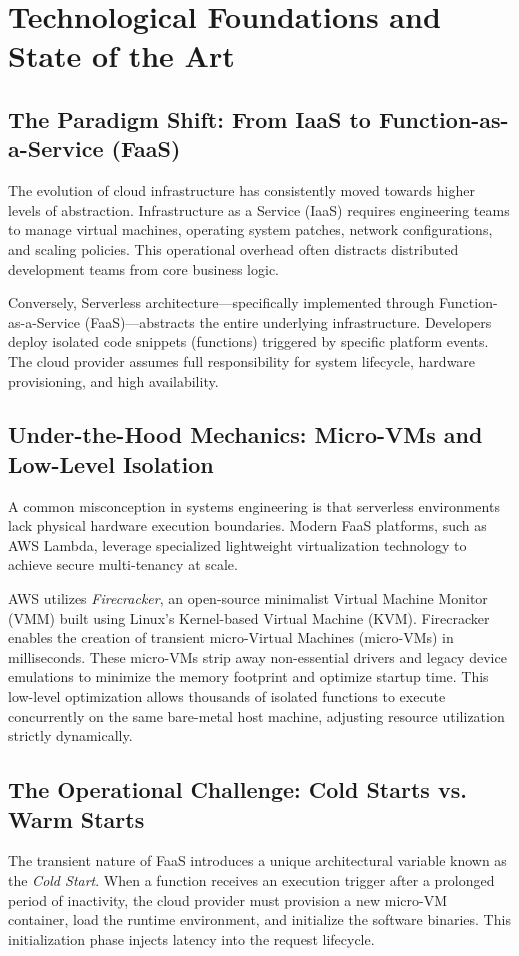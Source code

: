 \documentclass[conference]{IEEEtran}
\begin{document}
\section{Technological Foundations and State of the Art}

\subsection{The Paradigm Shift: From IaaS to Function-as-a-Service (FaaS)}
The evolution of cloud infrastructure has consistently moved towards higher levels of abstraction. Infrastructure as a Service (IaaS) requires engineering teams to manage virtual machines, operating system patches, network configurations, and scaling policies. This operational overhead often distracts distributed development teams from core business logic.

Conversely, Serverless architecture—specifically implemented through Function-as-a-Service (FaaS)—abstracts the entire underlying infrastructure. Developers deploy isolated code snippets (functions) triggered by specific platform events. The cloud provider assumes full responsibility for system lifecycle, hardware provisioning, and high availability.

\subsection{Under-the-Hood Mechanics: Micro-VMs and Low-Level Isolation}
A common misconception in systems engineering is that serverless environments lack physical hardware execution boundaries. Modern FaaS platforms, such as AWS Lambda, leverage specialized lightweight virtualization technology to achieve secure multi-tenancy at scale. 

AWS utilizes \textit{Firecracker}, an open-source minimalist Virtual Machine Monitor (VMM) built using Linux's Kernel-based Virtual Machine (KVM). Firecracker enables the creation of transient micro-Virtual Machines (micro-VMs) in milliseconds. These micro-VMs strip away non-essential drivers and legacy device emulations to minimize the memory footprint and optimize startup time. This low-level optimization allows thousands of isolated functions to execute concurrently on the same bare-metal host machine, adjusting resource utilization strictly dynamically.

\subsection{The Operational Challenge: Cold Starts vs. Warm Starts}
The transient nature of FaaS introduces a unique architectural variable known as the \textit{Cold Start}. When a function receives an execution trigger after a prolonged period of inactivity, the cloud provider must provision a new micro-VM container, load the runtime environment, and initialize the software binaries. This initialization phase injects latency into the request lifecycle. 
\end{document}
